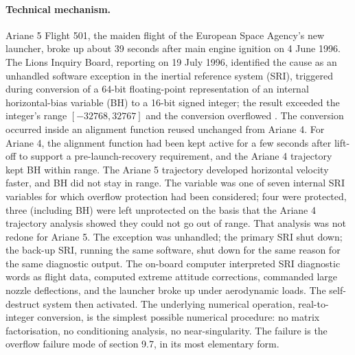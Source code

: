 \paragraph{Technical mechanism.}
Ariane 5 Flight 501, the maiden flight of the European Space Agency's
new launcher, broke up about 39 seconds after main engine ignition
on 4 June 1996. The Lions Inquiry Board, reporting on 19 July 1996,
identified the cause as an unhandled software exception in the
inertial reference system (SRI), triggered during conversion of a
64-bit floating-point representation of an internal horizontal-bias
variable (BH) to a 16-bit signed integer; the result exceeded the
integer's range $[-32768, 32767]$ and the conversion overflowed
\cite{acc:ariane501-ifr}. The conversion occurred inside an
alignment function reused unchanged from Ariane 4. For Ariane 4,
the alignment function had been kept active for a few seconds after
lift-off to support a pre-launch-recovery requirement, and the
Ariane 4 trajectory kept BH within range. The Ariane 5 trajectory
developed horizontal velocity faster, and BH did not stay in range.
The variable was one of seven internal SRI variables for which
overflow protection had been considered; four were protected, three
(including BH) were left unprotected on the basis that the Ariane 4
trajectory analysis showed they could not go out of range. That
analysis was not redone for Ariane 5. The exception was unhandled;
the primary SRI shut down; the back-up SRI, running the same
software, shut down for the same reason for the same diagnostic
output. The on-board computer interpreted SRI diagnostic words as
flight data, computed extreme attitude corrections, commanded large
nozzle deflections, and the launcher broke up under aerodynamic
loads. The self-destruct system then activated. The underlying
numerical operation, real-to-integer conversion, is the simplest
possible numerical procedure: no matrix factorisation, no
conditioning analysis, no near-singularity. The failure is the
overflow failure mode of section 9.7, in its most elementary form.

